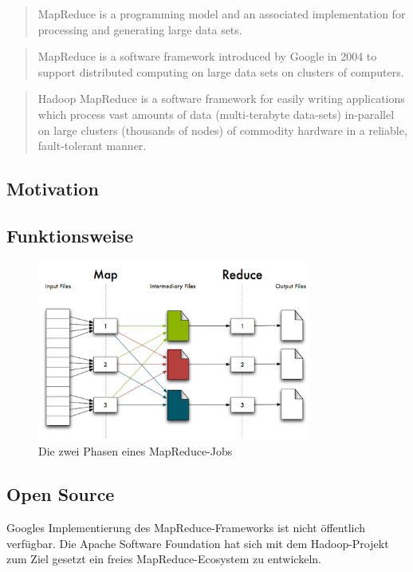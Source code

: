 \documentclass[a4paper]{article}
\begin{document}
\begin{quote}
MapReduce is a programming model and an associated implementation for processing and generating large data sets. \cite{MAPREDUCE}
\end{quote}

\begin{quote}
MapReduce is a software framework introduced by Google in 2004 to support distributed computing on large data sets on clusters of computers. \cite{WP-MAPREDUCE}
\end{quote}

\begin{quote}
Hadoop MapReduce is a software framework for easily writing applications which process vast amounts of data (multi-terabyte data-sets) in-parallel on large clusters (thousands of nodes) of commodity hardware in a reliable, fault-tolerant manner. \cite{HADOOP}
\end{quote}

\subsection{Motivation}

\subsection{Funktionsweise}

\begin{figure}[H]
\centering
\includegraphics[width=0.8\textwidth]{mapreduce.png}
\caption{Die zwei Phasen eines MapReduce-Jobs \protect\cite{GARFINKEL}}
\end{figure}

\subsection{Open Source}
Googles Implementierung des MapReduce-Frameworks ist nicht öffentlich verfügbar. Die Apache Software Foundation hat sich mit dem Hadoop-Projekt zum Ziel gesetzt ein freies MapReduce-Ecosystem zu entwickeln.
\end{document}

